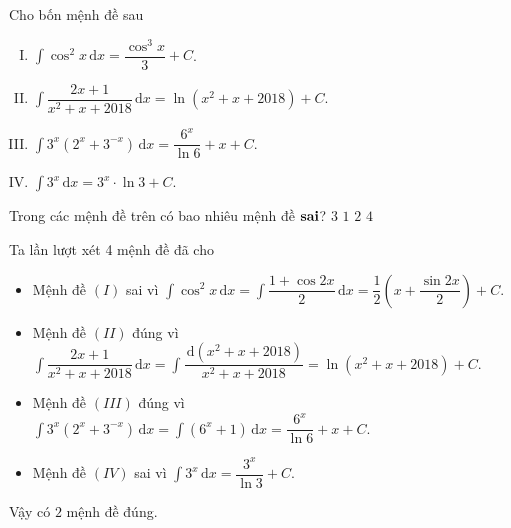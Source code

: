 \begin{ex}%
Cho bốn mệnh đề sau
\begin{enumerate}[I)]
\item $\displaystyle\int\limits \cos^2x \mathrm{\,d}x =\dfrac{\cos ^3x}{3}+C$.
\item $\displaystyle\int\limits \dfrac{2x+1}{x^2+x+2018}  \mathrm{\,d}x =\ln (x^2+x+2018)+C$.
\item $\displaystyle\int\limits 3^x\left( 2^x+3^{-x}\right) \mathrm{\,d}x =\dfrac{6^x}{\ln 6}+x+C$.
\item $\displaystyle\int\limits 3^x \mathrm{\,d}x= 3^x\cdot \ln 3+C$.
\end{enumerate}
Trong các mệnh đề trên có bao nhiêu mệnh đề $\bf {sai}$?
\choice
{$3$}
{$1$}
{\True $2$}
{$4$}
\loigiai
{
Ta lần lượt xét 4 mệnh đề đã cho
\begin{itemize}
\item Mệnh đề $(I)$ sai vì $\displaystyle\int\limits \cos^2x \mathrm{\,d}x =\displaystyle\int\limits \dfrac{1+\cos 2x}{2} \mathrm{\,d}x = \dfrac{1}{2} \left( x+ \dfrac{\sin 2x}{2}\right)+C.$
\item  Mệnh đề $(II)$ đúng vì $\displaystyle\int\limits \dfrac{2x+1}{x^2+x+2018}  \mathrm{\,d}x = \displaystyle\int\limits \dfrac{\mathrm{\,d}(x^2+x+2018)}{x^2+x+2018} =\ln (x^2+x+2018)+C.$
\item Mệnh đề $(III)$ đúng vì $\displaystyle\int\limits 3^x\left( 2^x+3^{-x}\right) \mathrm{\,d}x = \displaystyle\int\limits \left( 6^x + 1 \right)\mathrm{\,d}x =\dfrac{6^x}{\ln 6}+x+C. $
\item  Mệnh đề $(IV)$ sai vì $\displaystyle\int\limits 3^x \mathrm{\,d}x= \dfrac{3^x}{\ln 3}+C.$
\end{itemize}
Vậy có $2$ mệnh đề đúng.
}
\end{ex}
